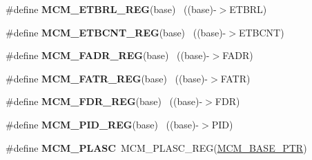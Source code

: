 \begin{DoxyCompactItemize}
\item 
\hypertarget{group___m_c_m___register___accessor___macros_gab144bfdec0d6f7c4d122fa43df862204}{}\#define {\bfseries M\+C\+M\+\_\+\+E\+T\+B\+R\+L\+\_\+\+R\+E\+G}(base)                                        ~((base)-\/$>$E\+T\+B\+R\+L)\label{group___m_c_m___register___accessor___macros_gab144bfdec0d6f7c4d122fa43df862204}

\item 
\hypertarget{group___m_c_m___register___accessor___macros_gab85d93512507faf0c706eba59d5533db}{}\#define {\bfseries M\+C\+M\+\_\+\+E\+T\+B\+C\+N\+T\+\_\+\+R\+E\+G}(base)                                      ~((base)-\/$>$E\+T\+B\+C\+N\+T)\label{group___m_c_m___register___accessor___macros_gab85d93512507faf0c706eba59d5533db}

\item 
\hypertarget{group___m_c_m___register___accessor___macros_ga8008df34b6be892fa16b8db98607b393}{}\#define {\bfseries M\+C\+M\+\_\+\+F\+A\+D\+R\+\_\+\+R\+E\+G}(base)                                          ~((base)-\/$>$F\+A\+D\+R)\label{group___m_c_m___register___accessor___macros_ga8008df34b6be892fa16b8db98607b393}

\item 
\hypertarget{group___m_c_m___register___accessor___macros_gac381fd1e5a44bb9ea62c657a8eb95de5}{}\#define {\bfseries M\+C\+M\+\_\+\+F\+A\+T\+R\+\_\+\+R\+E\+G}(base)                                          ~((base)-\/$>$F\+A\+T\+R)\label{group___m_c_m___register___accessor___macros_gac381fd1e5a44bb9ea62c657a8eb95de5}

\item 
\hypertarget{group___m_c_m___register___accessor___macros_ga53611079f9bb5cce2b0a6ca3efc9aa97}{}\#define {\bfseries M\+C\+M\+\_\+\+F\+D\+R\+\_\+\+R\+E\+G}(base)                                            ~((base)-\/$>$F\+D\+R)\label{group___m_c_m___register___accessor___macros_ga53611079f9bb5cce2b0a6ca3efc9aa97}

\item 
\hypertarget{group___m_c_m___register___accessor___macros_gad5853a8eb685730861f0c65d2c3cebf5}{}\#define {\bfseries M\+C\+M\+\_\+\+P\+I\+D\+\_\+\+R\+E\+G}(base)                                            ~((base)-\/$>$P\+I\+D)\label{group___m_c_m___register___accessor___macros_gad5853a8eb685730861f0c65d2c3cebf5}

\item 
\hypertarget{group___m_c_m___register___accessor___macros_ga1741cb7cdef46052c2ac9e7d28fb2b53}{}\#define {\bfseries M\+C\+M\+\_\+\+P\+L\+A\+S\+C}~M\+C\+M\+\_\+\+P\+L\+A\+S\+C\+\_\+\+R\+E\+G(\hyperlink{group___m_c_m___peripheral_gad41e931f176c230831e3dbad45117841}{M\+C\+M\+\_\+\+B\+A\+S\+E\+\_\+\+P\+T\+R})\label{group___m_c_m___register___accessor___macros_ga1741cb7cdef46052c2ac9e7d28fb2b53}


\end{DoxyCompactItemize}

